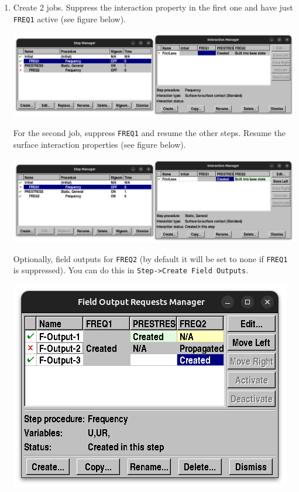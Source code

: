 \documentclass[11pt]{article}
\begin{document}
\begin{enumerate}
\begin{center}
\end{center}
\item Create 2 jobs. Suppress the interaction property in the first one and have just \texttt{FREQ1} active (see figure below).
\begin{center}
\includegraphics[width=.9\linewidth]{./figs/run1.png}
\end{center}
For the second job, suppress \texttt{FREQ1} and resume the other steps. Resume the surface interaction properties (see figure below).
\begin{center}
\includegraphics[width=.9\linewidth]{./figs/run2.png}
\end{center}
Optionally, field outputs for \texttt{FREQ2} (by default it will be set to none if \texttt{FREQ1} is suppressed).
You can do this in \texttt{Step->Create Field Outputs}.
\begin{center}
\includegraphics[width=.9\linewidth]{./figs/run2_fo.png}
\end{center}
\end{enumerate}
\end{document}
